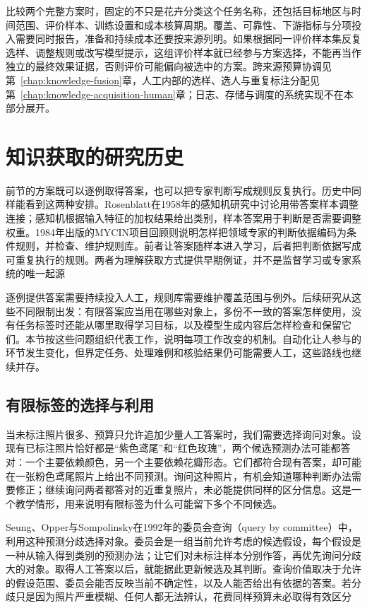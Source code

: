 比较两个完整方案时，固定的不只是花卉分类这个任务名称，还包括目标地区与时间范围、评价样本、训练设置和成本核算周期。覆盖、可靠性、下游指标与分项投入需要同时报告，准备和持续成本还要按来源列明。如果根据同一评价样本集反复选样、调整规则或改写模型提示，这组评价样本就已经参与方案选择，不能再当作独立的最终效果证据，否则评价可能偏向被选中的方案。跨来源预算协调见第~\ref{chap:knowledge-fusion}章，人工内部的选样、选人与重复标注分配见第~\ref{chap:knowledge-acquisition-human}章；日志、存储与调度的系统实现不在本部分展开。

\section{知识获取的研究历史}
\label{sec:knowledge-acquisition-history}

前节的方案既可以逐例取得答案，也可以把专家判断写成规则反复执行。历史中同样能看到这两种安排。Rosenblatt在1958年的感知机研究中讨论用带答案样本调整连接；感知机根据输入特征的加权结果给出类别，样本答案用于判断是否需要调整权重。1984年出版的MYCIN项目回顾则说明怎样把领域专家的判断依据编码为条件规则，并检查、维护规则库。前者让答案随样本进入学习，后者把判断依据写成可重复执行的规则。两者为理解获取方式提供早期例证，并不是监督学习或专家系统的唯一起源

逐例提供答案需要持续投入人工，规则库需要维护覆盖范围与例外。后续研究从这些不同限制出发：有限答案应当用在哪些对象上，多份不一致的答案怎样使用，没有任务标签时还能从哪里取得学习目标，以及模型生成内容后怎样检查和保留它们。本节按这些问题组织代表工作，说明每项工作改变的机制。自动化让人参与的环节发生变化，但界定任务、处理难例和核验结果仍可能需要人工，这些路线也继续并存。

\subsection{有限标签的选择与利用}
\label{sec:knowledge-acquisition-history-label-budget}

当未标注照片很多、预算只允许追加少量人工答案时，我们需要选择询问对象。设现有已标注照片恰好都是“紫色鸢尾”和“红色玫瑰”，两个候选预测办法可能都答对：一个主要依赖颜色，另一个主要依赖花瓣形态。它们都符合现有答案，却可能在一张粉色鸢尾照片上给出不同预测。询问这种照片，有机会知道哪种判断办法需要修正；继续询问两者都答对的近重复照片，未必能提供同样的区分信息。这是一个教学情形，用来说明有限标签为什么可能留下多个不同候选。

Seung、Opper与Sompolinsky在1992年的委员会查询（query by committee）中，利用这种预测分歧选择对象。委员会是一组当前允许考虑的候选假设，每个假设是一种从输入得到类别的预测办法；让它们对未标注样本分别作答，再优先询问分歧大的对象。取得人工答案以后，就能据此更新候选及其判断。查询价值取决于允许的假设范围、委员会能否反映当前不确定性，以及人能否给出有依据的答案。若分歧只是因为照片严重模糊、任何人都无法辨认，花费同样预算未必取得有效区分


